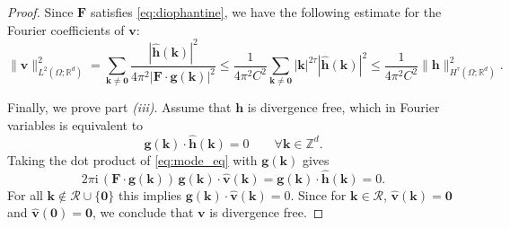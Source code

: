 \documentclass[12pt]{article}
\begin{document}
\begin{proof}
Since $\mathbf{F}$ satisfies \eqref{eq:diophantine}, we have the following estimate for the Fourier coefficients of $\boldsymbol{v}$:$$\|\boldsymbol{v}\|_{L^2(\Omega; \mathbb{R}^d)}^2 = \sum_{\boldsymbol{k} \neq \mathbf{0}} \frac{|\hat{\boldsymbol{h}}(\boldsymbol{k})|^2}{4\pi^2 |\mathbf{F}\cdot \boldsymbol{g}(\boldsymbol{k})|^2} \le \frac{1}{4\pi^2 C^2} \sum_{\boldsymbol{k} \neq \mathbf{0}} |\boldsymbol{k}|^{2\tau} |\hat{\boldsymbol{h}}(\boldsymbol{k})|^2 \le \frac{1}{4\pi^2 C^2} \|\boldsymbol{h}\|_{H^\tau(\Omega; \mathbb{R}^d)}^2.
$$




Finally, we prove part \textit{(iii)}. Assume that $\boldsymbol h$ is divergence free, which in
Fourier variables is equivalent to
\[
\boldsymbol{g}(\boldsymbol{k})\cdot\hat{\boldsymbol h}(\boldsymbol{k})=0
\qquad \forall\boldsymbol{k}\in\mathbb{Z}^d.
\]
Taking the dot product of \eqref{eq:mode_eq} with $\boldsymbol{g}(\boldsymbol{k})$ gives
{{} \[
2\pi \mathrm{i}\,(\mathbf F\cdot\boldsymbol{g}(\boldsymbol{k}))\,\boldsymbol{g}(\boldsymbol{k})\cdot\hat{\boldsymbol v}(\boldsymbol{k})
=
\boldsymbol{g}(\boldsymbol{k})\cdot\hat{\boldsymbol h}(\boldsymbol{k})
=0.
\]}
For all $\boldsymbol{k}\notin\mathcal R\cup\{\boldsymbol 0\}$ this implies
$\boldsymbol{g}(\boldsymbol{k})\cdot\hat{\boldsymbol v}(\boldsymbol{k})=0$. Since for $\boldsymbol{k}\in\mathcal R$, $\hat{\boldsymbol v}(\boldsymbol{k})=\boldsymbol 0$ and $\hat{\boldsymbol v}(\boldsymbol{0})=\boldsymbol 0$, we conclude that $\boldsymbol{v}$ is divergence free. 
\end{proof}
\end{document}
